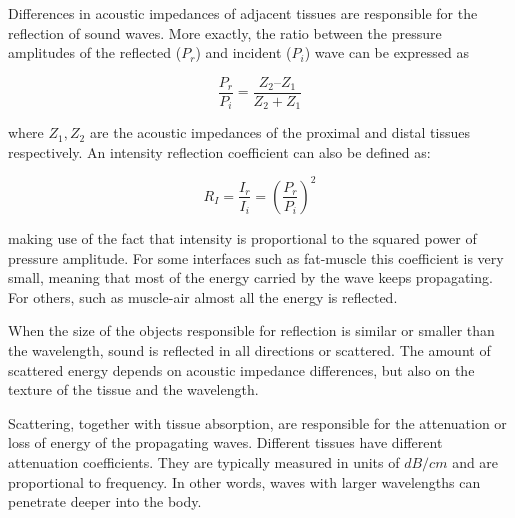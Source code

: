 \documentclass[12pt]{article} %
\begin{document}
	Differences in acoustic impedances of adjacent tissues are responsible for the reflection of sound waves. More exactly, the ratio between the pressure amplitudes of the reflected ($P_r$) and incident ($P_i$) wave can be expressed as	
	
\begin{equation}
\frac{P_r}{P_i} = \frac{Z_2 – Z_1}{Z_2 + Z_1}
\end{equation}
	
	where $Z_1, Z_2$ are the acoustic impedances of the proximal and distal tissues respectively. An intensity reflection coefficient can also be defined as: 	
	
\begin{equation}
R_I = \frac{I_r}{I_i} = \left( \frac{P_r}{P_i} \right)^2
\end{equation}
	
	making use of the fact that intensity is proportional to the squared power of pressure amplitude. For some interfaces such as fat-muscle this coefficient is very small, meaning that most of the energy carried by the wave keeps propagating. For others, such as muscle-air almost all the energy is reflected.

	
	When the size of the objects responsible for reflection is similar or smaller than the wavelength, sound is reflected in all directions or scattered. The amount of scattered energy depends on acoustic impedance differences, but also on the texture of the tissue and the wavelength.

	
	Scattering, together with tissue absorption, are responsible for the attenuation or loss of energy of the propagating waves. Different tissues have different attenuation coefficients. They are typically measured in units of $dB/cm$ and are proportional to frequency. In other words, waves with larger wavelengths can penetrate deeper into the body. \cite{bushberg}
\end{document}
